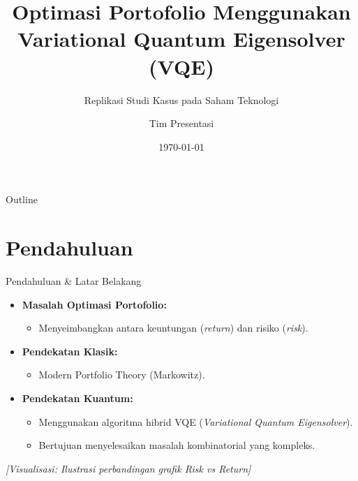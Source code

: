 \documentclass{beamer}
\title[Optimasi Portofolio dengan VQE]{Optimasi Portofolio Menggunakan Variational Quantum Eigensolver (VQE)}
\subtitle{Replikasi Studi Kasus pada Saham Teknologi}
\author{Tim Presentasi}
\date{\today}
\begin{document}
\begin{frame}
    \titlepage
\end{frame}

\begin{frame}{Outline}
    \tableofcontents
\end{frame}

\section{Pendahuluan}
\begin{frame}{Pendahuluan \& Latar Belakang}
    \begin{itemize}
        	\item \textbf{Masalah Optimasi Portofolio:}
        \begin{itemize}
            	\item Menyeimbangkan antara keuntungan (\textit{return}) dan risiko (\textit{risk}).
        \end{itemize}
        \item \textbf{Pendekatan Klasik:}
        \begin{itemize}
            	\item Modern Portfolio Theory (Markowitz).
        \end{itemize}
        \item \textbf{Pendekatan Kuantum:}
        \begin{itemize}
            	\item Menggunakan algoritma hibrid VQE (\textit{Variational Quantum Eigensolver}).
            	\item Bertujuan menyelesaikan masalah kombinatorial yang kompleks.
        \end{itemize}
    \end{itemize}
    
    \vspace{0.5cm}
    \begin{center}
        \textit{[Visualisasi: Ilustrasi perbandingan grafik Risk vs Return]}
    \end{center}
\end{frame}

\end{document}
